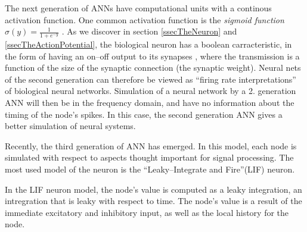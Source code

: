 The next generation of ANNs have computational units with a continous activation function. 
One common activation function is the \emph{sigmoid function} $\sigma(y)=\frac{1}{1+e^{-y}}$ \cite{HaykinANNbok}.
As we discover in section \ref{ssecTheNeuron} and \ref{ssecTheActionPotential}, the biological neuron has a boolean carracteristic, in the form of having an on--off output to its synapses %
	, where the transmission is a function of the size of the synaptic connection (the synaptic weight). %
Neural nets of the second generation can therefore be viewed as ``firing rate interpretations'' of biological neural networks\cite{Maass97networksof}.
Simulation of a neural network by a 2. generation ANN will then be in the frequency domain, and have no information about the timing of the node's spikes. %
In this case, the second generation ANN gives a better simulation of neural systems. 




Recently, the third generation of ANN has emerged. In this model, each node is simulated with respect to aspects thought important for signal processing.
The most used model of the neuron is the ``Leaky--Integrate and Fire''(LIF) neuron. %

In the LIF neuron model, the node's value is computed as a leaky integration, an intregration that is leaky with respect to time.
The node's value is a result of the immediate excitatory and inhibitory input, as well as the local history for the node.

